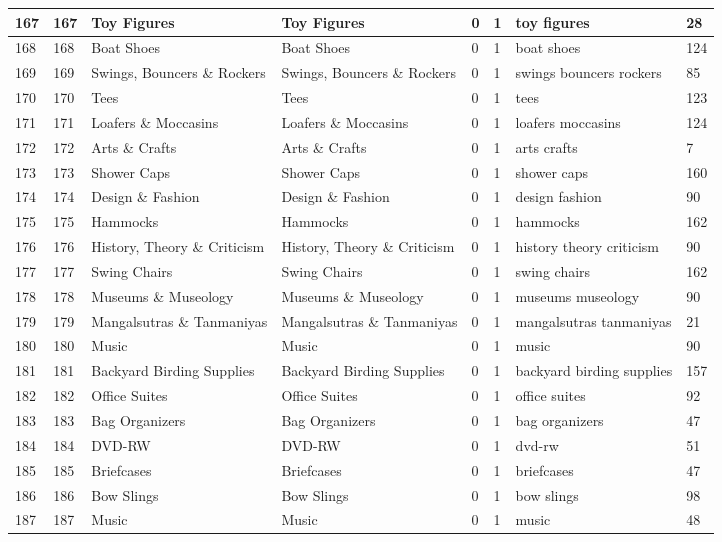 \begin{longtable}{|l|l|l|l|l|l|l|l|}
167 & 167 & Toy Figures & Toy Figures & 0 & 1 & toy figures & 28 \\ \hline 
168 & 168 & Boat Shoes & Boat Shoes & 0 & 1 & boat shoes & 124 \\ \hline 
169 & 169 & Swings, Bouncers \& Rockers & Swings, Bouncers \& Rockers & 0 & 1 & swings bouncers rockers & 85 \\ \hline 
170 & 170 & Tees & Tees & 0 & 1 & tees & 123 \\ \hline 
171 & 171 & Loafers \& Moccasins & Loafers \& Moccasins & 0 & 1 & loafers moccasins & 124 \\ \hline 
172 & 172 & Arts \& Crafts & Arts \& Crafts & 0 & 1 & arts crafts & 7 \\ \hline 
173 & 173 & Shower Caps & Shower Caps & 0 & 1 & shower caps & 160 \\ \hline 
174 & 174 & Design \& Fashion & Design \& Fashion & 0 & 1 & design fashion & 90 \\ \hline 
175 & 175 & Hammocks & Hammocks & 0 & 1 & hammocks & 162 \\ \hline 
176 & 176 & History, Theory \& Criticism & History, Theory \& Criticism & 0 & 1 & history theory criticism & 90 \\ \hline 
177 & 177 & Swing Chairs & Swing Chairs & 0 & 1 & swing chairs & 162 \\ \hline 
178 & 178 & Museums \& Museology & Museums \& Museology & 0 & 1 & museums museology & 90 \\ \hline 
179 & 179 & Mangalsutras \& Tanmaniyas & Mangalsutras \& Tanmaniyas & 0 & 1 & mangalsutras tanmaniyas & 21 \\ \hline 
180 & 180 & Music & Music & 0 & 1 & music & 90 \\ \hline 
181 & 181 & Backyard Birding Supplies & Backyard Birding Supplies & 0 & 1 & backyard birding supplies & 157 \\ \hline 
182 & 182 & Office Suites & Office Suites & 0 & 1 & office suites & 92 \\ \hline 
183 & 183 & Bag Organizers & Bag Organizers & 0 & 1 & bag organizers & 47 \\ \hline 
184 & 184 & DVD-RW & DVD-RW & 0 & 1 & dvd-rw & 51 \\ \hline 
185 & 185 & Briefcases & Briefcases & 0 & 1 & briefcases & 47 \\ \hline 
186 & 186 & Bow Slings & Bow Slings & 0 & 1 & bow slings & 98 \\ \hline 
187 & 187 & Music & Music & 0 & 1 & music & 48 \\ \hline 

\end{longtable}
